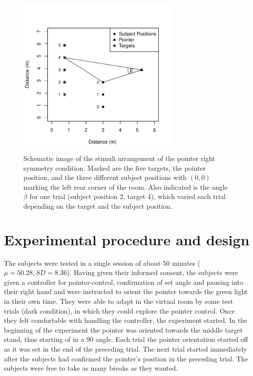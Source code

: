 \begin{figure}
    \centering
    \includegraphics[width=8cm]{Images/schematicAufbau.pdf}
    \caption{Schematic image of the stimuli arrangement of the pointer right symmetry condition. Marked are the five targets, the pointer position, and the three different subject positions with $(0,0)$ marking the left rear corner of the room. Also indicated is the angle $\beta$ for one trial (subject position 2, target 4), which varied each trial depending on the target and the subject position.} 
    \label{SchematicAufbau}
\end{figure}

\section{Experimental procedure and design}
The subjects were tested in a single session of about 50 minutes ($\mu = 50.28, SD = 8.36$). Having given their informed consent, the subjects were given a controller for pointer-control, %
confirmation of set angle and pausing into their right hand and were instructed to orient the pointer towards the green light in their own time. They were able to adapt in the virtual room by some test trials (dark condition), in which they could explore the pointer control. Once they felt comfortable with handling the controller, the experiment started. In the beginning of the experiment the pointer was oriented towards the middle target stand, thus starting of in a 90\textdegree{} angle. Each trial the pointer orientation started off as it was set in the end of the preceding trial. The next trial started immediately after the subjects had confirmed the pointer's position in the preceding trial. The subjects were free to take as many breaks as they wanted. %


